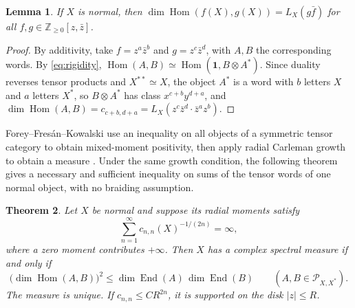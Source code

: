 \documentclass[11pt,reqno]{amsart}
\newtheorem{theorem}{Theorem}[section]
\newtheorem{lemma}[theorem]{Lemma}
\theoremstyle{definition}
\newcommand{\Hom}{\operatorname{Hom}}
\newcommand{\End}{\operatorname{End}}
\newcommand{\one}{\mathbf 1}
\newcommand{\ZZ}{\mathbb Z}
\begin{document}
\begin{lemma}\label{lem:complexbridge}
If $X$ is normal, then $\dim\Hom(f(X),g(X))=L_X(g\bar f)$ for all $f,g\in\ZZ_{\geq0}[z,\bar z]$.
\end{lemma}

\begin{proof}
By additivity, take $f=z^a\bar z^b$ and $g=z^c\bar z^d$, with $A,B$ the corresponding words. By \eqref{eq:rigidity}, $\Hom(A,B)\simeq\Hom(\one,B\otimes A^*)$. Since duality reverses tensor products and $X^{**}\simeq X$, the object $A^*$ is a word with $b$ letters $X$ and $a$ letters $X^*$, so $B\otimes A^*$ has class $x^{c+b}y^{d+a}$, and $\dim\Hom(A,B)=c_{c+b,d+a}=L_X(z^c\bar z^d\cdot\bar z^az^b)$.
\end{proof}

Forey--Fresán--Kowalski use an inequality on all objects of a symmetric tensor category to obtain mixed-moment positivity, then apply radial Carleman growth to obtain a measure \cite[Proposition~2.2]{FFK}. Under the same growth condition, the following theorem gives a necessary and sufficient inequality on sums of the tensor words of one normal object, with no braiding assumption.

\begin{theorem}\label{thm:complex}
Let $X$ be normal and suppose its radial moments satisfy
\[
   \sum_{n=1}^{\infty}c_{n,n}(X)^{-1/(2n)}=\infty,
\]
where a zero moment contributes $+\infty$. Then $X$ has a complex spectral measure if and only if
\[
 \bigl(\dim\Hom(A,B)\bigr)^2\leq\dim\End(A)\,\dim\End(B)\qquad(A,B\in\mathcal P_{X,X^*}).
\]
The measure is unique. If $c_{n,n}\le CR^{2n}$, it is supported on the disk $|z|\le R$.
\end{theorem}
\end{document}
